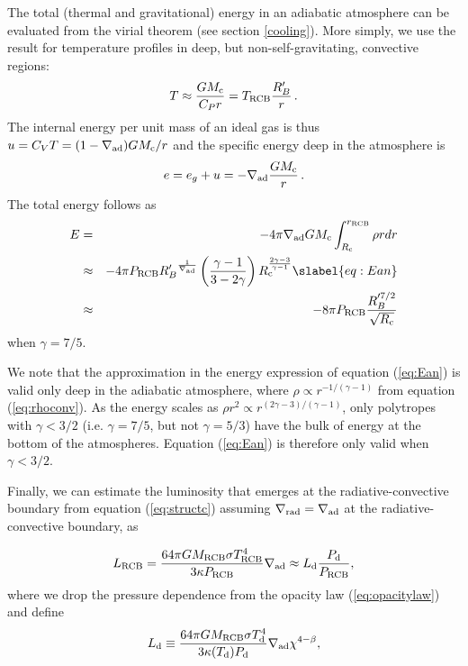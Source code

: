 \documentclass[apj]{emulateapj}
\newcommand{\delad}{\nabla_{\rm ad}}
\newcommand{\delrad}{\nabla_{\rm rad}}
\newcommand{\Rg}{\mathcal{R}}
\newcommand{\co}{_{\rm c}}
\newcommand{\di}{_{\rm d}}
\newcommand{\cb}{_{\rm RCB}}
\begin{document}
The total (thermal and gravitational) energy in an adiabatic atmosphere can be evaluated from the virial theorem (see section \ref{cooling}).  More simply, we use the result for temperature profiles in deep, but non-self-gravitating, convective regions:
\begin{equation}
T \approx {G M\co \over C_P r} = T\cb {R_B' \over r}\, .
\end{equation} 
The internal energy per unit mass of an ideal gas is thus $u = C_V T = (1 - \delad) G M\co/r$ and the specific energy  deep in the atmosphere is
\begin{equation}
e = e_g + u = -\delad {GM\co \over r} \, .
\end{equation} 
The total energy follows as
\begin{eqnarray} 
E &=& - 4 \pi \nabla_{\rm ad} G M\co \int_{R\co}^{r\cb} \rho r dr \\
&\approx& - 4 \pi P\cb {R_B'}^{1 \over \nabla_{\rm ad}} \left(\gamma-1 \over 3 - 2 \gamma\right)  R\co^{2\gamma-3\over \gamma-1}  \slabel{eq:Ean} \\ 
&\approx& - 8 \pi P\cb {R_B'^{7/2} \over \sqrt{R\co}}
\end{eqnarray} 
when $\gamma = 7/5$. %

We note that the approximation in the energy expression of equation (\ref{eq:Ean}) is valid only deep in the adiabatic atmosphere, where  $\rho \propto r^{-1/(\gamma -1)}$ from equation (\ref{eq:rhoconv}).  As the energy scales as $\rho r^2 \propto r^{(2\gamma -3)/(\gamma - 1)}$, only polytropes with $\gamma < 3/2$ (i.e. $\gamma = 7/5$, but not $\gamma = 5/3$) have the bulk of energy at the bottom of the atmospheres.  Equation (\ref{eq:Ean}) is therefore only valid when $\gamma<3/2$. %

Finally, we can estimate the luminosity that emerges at the radiative-convective boundary from equation (\ref{eq:structc}) assuming $\delrad=\delad$ at the radiative-convective boundary, as

\begin{equation} \label{eq:Lcb}
L\cb = {64 \pi G M\cb \sigma T\cb^4 \over 3 \kappa P\cb } \nabla_{\rm ad} \approx L\di {P_{\rm d} \over P\cb}, %
\end{equation} 
where we drop the pressure dependence from the opacity law (\ref{eq:opacitylaw}) and define 
\begin{equation} 
L\di \equiv {64 \pi G M\cb \sigma T_{\rm d}^4 \over 3 \kappa(T_{\rm d}) P_{\rm d}} \nabla_{\rm ad}\chi^{4-\beta}, 
\end{equation} 
\end{document}

